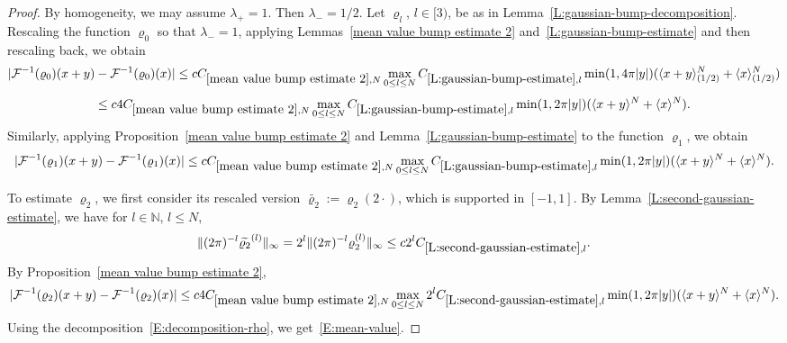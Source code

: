 \documentclass[12pt,reqno]{amsart}
\theoremstyle{plain}
\numberwithin{equation}{section}
\theoremstyle{remark}
\begin{document}
\begin{proof}
By homogeneity, we may assume $\lambda_{+}=1$. Then $\lambda_{-}=1/2$.
Let $\varrho_l$, $l\in [3)$, be as in Lemma~\ref{L:gaussian-bump-decomposition}. Rescaling the function $\varrho_0$ so that $\lambda_{-}=1$, applying Lemmas~\ref{mean value bump estimate 2} and~\ref{L:gaussian-bump-estimate} and then rescaling back, we obtain
\begin{equation*}
     |\mathcal{F}^{-1}(\varrho_0)(x+y)-\mathcal{F}^{-1}(\varrho_0)(x)|\le cC_{\ref{mean value bump estimate 2},N}\max_{0\leq l \leq N} C_{\ref{L:gaussian-bump-estimate},l}
     \min(1,4\pi|y|) (\langle x+y\rangle^N_{(1/2)}+
\langle x\rangle^N_{(1/2)})
\end{equation*}
\[
\leq c 4C_{\ref{mean value bump estimate 2},N} \max_{0\leq l \leq N} C_{\ref{L:gaussian-bump-estimate},l} \min(1,2\pi|y|) (\langle x+y\rangle^N+
\langle x\rangle^N).
\]
Similarly, applying Proposition~\ref{mean value bump estimate 2} and Lemma~\ref{L:gaussian-bump-estimate} to the function $\varrho_1$, we obtain
\begin{equation*}
     |\mathcal{F}^{-1}(\varrho_1)(x+y)-\mathcal{F}^{-1}(\varrho_1)(x)|\le c C_{\ref{mean value bump estimate 2},N}\max_{0\leq l \leq N} C_{\ref{L:gaussian-bump-estimate},l}
     \min(1,2\pi|y|) (\langle x+y\rangle^N+
\langle x\rangle^N).
\end{equation*}

To estimate $\varrho_2$, we first consider its rescaled version $\widetilde{\varrho_2}:=\varrho_2(2\cdot)$, which is supported in $[-1,1]$. By Lemma~\ref{L:second-gaussian-estimate}, we have for $l\in \mathbb N$, $l\leq N$,
\[
\|(2\pi)^{-l}\widetilde{\varrho_2}^{(l)}\|_{\infty}
=2^l\|(2\pi)^{-l}\varrho_2^{(l)}\|_{\infty}
\leq c 2^lC_{\ref{L:second-gaussian-estimate},l}.
\]
By Proposition~\ref{mean value bump estimate 2},
\begin{equation*}
     |\mathcal{F}^{-1}(\varrho_2)(x+y)-\mathcal{F}^{-1}(\varrho_2)(x)|\le c 4C_{\ref{mean value bump estimate 2},N}\max_{0\leq l \leq N} 2^lC_{\ref{L:second-gaussian-estimate},l}
     \min(1,2\pi|y|) (\langle x+y\rangle^N+
\langle x\rangle^N).
\end{equation*}
Using the decomposition~\eqref{E:decomposition-rho}, we get~\eqref{E:mean-value}.
\end{proof}
\end{document}
